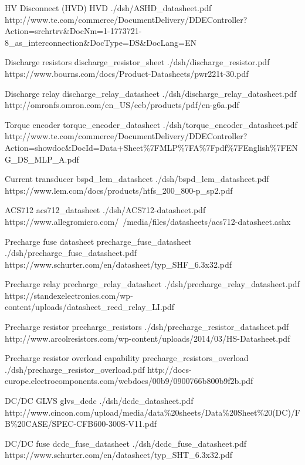 	{HV Disconnect (HVD)}
	{HVD}
	{./dsh/ASHD_datasheet.pdf}
	{http://www.te.com/commerce/DocumentDelivery/DDEController?Action=srchrtrv\&DocNm=1-1773721-8_as_interconnection\&DocType=DS\&DocLang=EN}

	{Discharge resistors}
	{discharge_resistor_sheet}
	{./dsh/discharge_resistor.pdf}
	{https://www.bourns.com/docs/Product-Datasheets/pwr221t-30.pdf}

	{Discharge relay}
	{discharge_relay_datasheet}
	{./dsh/discharge_relay_datasheet.pdf}
	{http://omronfs.omron.com/en_US/ecb/products/pdf/en-g6a.pdf}


	{Torque encoder}
	{torque_encoder_datasheet}
	{./dsh/torque_encoder_datasheet.pdf}
	{http://www.te.com/commerce/DocumentDelivery/DDEController?Action=showdoc\&DocId=Data+Sheet\%7FMLP\%7FA\%7Fpdf\%7FEnglish\%7FENG_DS_MLP_A.pdf}

	{Current transducer}
	{bspd_lem_datasheet}
	{./dsh/bspd_lem_datasheet.pdf}
	{https://www.lem.com/docs/products/htfs_200_800-p_sp2.pdf}

	{ACS712}
	{acs712_datasheet}
	{./dsh/ACS712-datasheet.pdf}
	{https://www.allegromicro.com/~/media/files/datasheets/acs712-datasheet.ashx}

	{Precharge fuse datasheet}
	{precharge_fuse_datasheet}
	{./dsh/precharge_fuse_datasheet.pdf}
	{https://www.schurter.com/en/datasheet/typ_SHF_6.3x32.pdf}

	{Precharge relay}
	{precharge_relay_datasheet}
	{./dsh/precharge_relay_datasheet.pdf}
	{https://standexelectronics.com/wp-content/uploads/datasheet_reed_relay_LI.pdf}

	{Precharge resistor}
	{precharge_resistors}
	{./dsh/precharge_resistor_datasheet.pdf}
	{http://www.arcolresistors.com/wp-content/uploads/2014/03/HS-Datasheet.pdf}

	{Precharge resistor overload capability}
	{precharge_resistors_overload}
	{./dsh/precharge_resistor_overload.pdf}
	{http://docs-europe.electrocomponents.com/webdocs/00b9/0900766b800b9f2b.pdf}

	{DC/DC GLVS}
	{glvs_dcdc}
	{./dsh/dcdc_datasheet.pdf}
	{http://www.cincon.com/upload/media/data\%20sheets/Data\%20Sheet\%20(DC)/FB\%20CASE/SPEC-CFB600-300S-V11.pdf}

	{DC/DC fuse}
	{dcdc_fuse_datasheet}
	{./dsh/dcdc_fuse_datasheet.pdf}
	{https://www.schurter.com/en/datasheet/typ_SHT_6.3x32.pdf}


